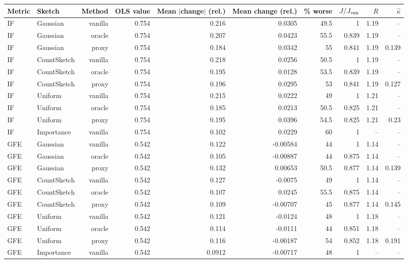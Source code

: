 \begin{table}[t]
\centering
\small
\begin{tabular}{llrrrrrrrr}
\toprule
Metric & Sketch & Method & OLS value & Mean $|$change$|$ (rel.) & Mean change (rel.) & \% worse & $J/J_{\rm van}$ & $R$ & $\hat\kappa$ \\
\midrule
IF & Gaussian & vanilla & 0.754 & 0.216 & 0.0305 & 49.5 & 1 & 1.19 & -- \\
IF & Gaussian & oracle & 0.754 & 0.207 & 0.0423 & 55.5 & 0.839 & 1.19 & -- \\
IF & Gaussian & proxy & 0.754 & 0.184 & 0.0342 & 55 & 0.841 & 1.19 & 0.139 \\
IF & CountSketch & vanilla & 0.754 & 0.218 & 0.0256 & 50.5 & 1 & 1.19 & -- \\
IF & CountSketch & oracle & 0.754 & 0.195 & 0.0128 & 53.5 & 0.839 & 1.19 & -- \\
IF & CountSketch & proxy & 0.754 & 0.196 & 0.0295 & 53 & 0.841 & 1.19 & 0.127 \\
IF & Uniform & vanilla & 0.754 & 0.215 & 0.0222 & 49 & 1 & 1.21 & -- \\
IF & Uniform & oracle & 0.754 & 0.185 & 0.0213 & 50.5 & 0.825 & 1.21 & -- \\
IF & Uniform & proxy & 0.754 & 0.195 & 0.0396 & 54.5 & 0.825 & 1.21 & 0.23 \\
IF & Importance & vanilla & 0.754 & 0.102 & 0.0229 & 60 & 1 & -- & -- \\
\midrule
GFE & Gaussian & vanilla & 0.542 & 0.122 & -0.00584 & 44 & 1 & 1.14 & -- \\
GFE & Gaussian & oracle & 0.542 & 0.105 & -0.00887 & 44 & 0.875 & 1.14 & -- \\
GFE & Gaussian & proxy & 0.542 & 0.132 & 0.00653 & 50.5 & 0.877 & 1.14 & 0.139 \\
GFE & CountSketch & vanilla & 0.542 & 0.127 & -0.0075 & 49 & 1 & 1.14 & -- \\
GFE & CountSketch & oracle & 0.542 & 0.107 & 0.0245 & 55.5 & 0.875 & 1.14 & -- \\
GFE & CountSketch & proxy & 0.542 & 0.109 & -0.00707 & 45 & 0.877 & 1.14 & 0.145 \\
GFE & Uniform & vanilla & 0.542 & 0.121 & -0.0124 & 48 & 1 & 1.18 & -- \\
GFE & Uniform & oracle & 0.542 & 0.114 & -0.0111 & 44 & 0.851 & 1.18 & -- \\
GFE & Uniform & proxy & 0.542 & 0.116 & -0.00187 & 54 & 0.852 & 1.18 & 0.191 \\
GFE & Importance & vanilla & 0.542 & 0.0912 & -0.00717 & 48 & 1 & -- & -- \\

\end{tabular}
\end{table}

